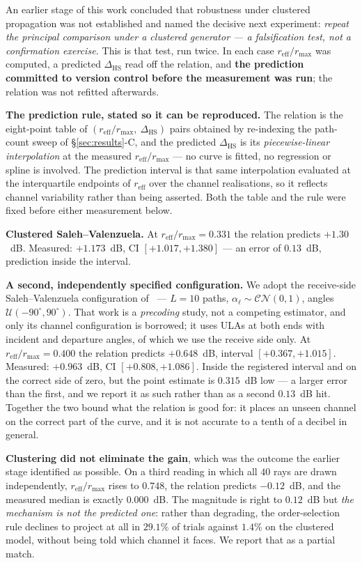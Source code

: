 \documentclass[journal]{IEEEtran}
\newcommand{\CN}{\mathcal{CN}}
\newcommand{\reff}{r_{\mathrm{eff}}}
\newcommand{\rmax}{r_{\max}}
\newcommand{\dhs}{\Delta_{\mathrm{HS}}}
\begin{document}
An earlier stage of this work concluded that robustness under clustered
propagation was not established and named the decisive next experiment:
\emph{repeat the principal comparison under a clustered generator --- a
falsification test, not a confirmation exercise.} This is that test, run twice.
In each case $\reff/\rmax$ was computed, a predicted $\dhs$ read off the
relation, and \textbf{the prediction committed to version control before the
measurement was run}; the relation was not refitted afterwards.

\textbf{The prediction rule, stated so it can be reproduced.} The relation is
the eight-point table of $(\reff/\rmax,\ \dhs)$ pairs obtained by re-indexing
the path-count sweep of \S\ref{sec:results}-C, and the predicted $\dhs$ is its
\emph{piecewise-linear interpolation} at the measured $\reff/\rmax$ --- no
curve is fitted, no regression or spline is involved. The prediction interval
is that same interpolation evaluated at the interquartile endpoints of
$\reff$ over the channel realisations, so it reflects channel variability
rather than being asserted. Both the table and the rule were fixed before
either measurement below.

\textbf{Clustered Saleh--Valenzuela.} At $\reff/\rmax=0.331$ the relation
predicts $+1.30$~dB. Measured:
$+1.173$~dB, CI $[+1.017,+1.380]$ --- an error of $0.13$~dB, prediction inside
the interval.

\textbf{A second, independently specified configuration.} We adopt the
receive-side Saleh--Valenzuela configuration of~\cite{precoding2408} --- $L=10$
paths, $\alpha_\ell\sim\CN(0,1)$, angles $\mathcal{U}(-90^\circ,90^\circ)$. That work is a
\emph{precoding} study, not a competing estimator, and only its channel
configuration is borrowed; it uses ULAs at both ends with incident and
departure angles, of which we use the receive side only. At
$\reff/\rmax=0.400$ the relation predicts $+0.648$~dB, interval
$[+0.367,+1.015]$. Measured: $+0.963$~dB, CI $[+0.808,+1.086]$. Inside the
registered interval and on the correct side of zero, but the point estimate is
$0.315$~dB low --- a larger error than the first, and we report it as such
rather than as a second $0.13$~dB hit. Together the two bound what the relation
is good for: it places an unseen channel on the correct part of the curve, and
it is not accurate to a tenth of a decibel in general.

\textbf{Clustering did not eliminate the gain}, which was the outcome the
earlier stage identified as possible. On a third reading in which all $40$ rays
are drawn independently, $\reff/\rmax$ rises to $0.748$, the relation predicts
$-0.12$~dB, and the measured median is exactly $0.000$~dB. The magnitude is
right to $0.12$~dB but \emph{the mechanism is not the predicted one}: rather
than degrading, the order-selection rule declines to project at all in
$29.1\%$ of trials against $1.4\%$ on the clustered model, without being told
which channel it faces. We report that as a partial match.
\end{document}
